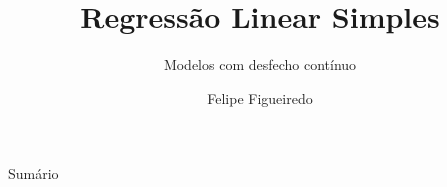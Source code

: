 \documentclass{beamer}
\title%
{Regressão Linear Simples}
\subtitle
{Modelos com desfecho contínuo} %
\author%
{Felipe Figueiredo}%
\institute[INTO] %
{Instituto Nacional de Traumatologia e Ortopedia
}
\date%
{}
\begin{document}
\begin{frame}
  \titlepage
\end{frame}

\begin{frame}{Sumário}
  \tableofcontents
\end{frame}








\end{document}
